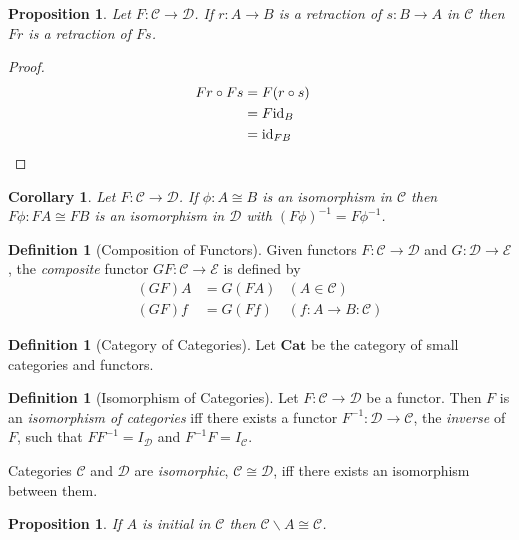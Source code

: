 \documentclass{book}
\let\qed\relax
\newtheorem{prop}[ax]{Proposition}
\newtheorem{cor}{Corollary}[ax]
\theoremstyle{definition}
\newtheorem{df}[ax]{Definition}
\newcommand{\id}[1]{\ensuremath{\mathrm{id}_{#1}}}
\newcommand{\inv}[1]{\ensuremath{{#1}^{-1}}}
\begin{document}
\begin{prop}
Let $F : \mathcal{C} \rightarrow \mathcal{D}$. If $r : A \rightarrow B$ is a retraction of $s : B \rightarrow A$ in $\mathcal{C}$ then $Fr$ is a retraction of $Fs$.
\end{prop}

\begin{proof}
\pf
\begin{align*}
Fr \circ Fs & = F(r \circ s) \\
& = F \id{B} \\
& = \id{FB} & \qed
\end{align*}
\end{proof}

\begin{cor}
Let $F : \mathcal{C} \rightarrow \mathcal{D}$. If $\phi : A \cong B$ is an isomorphism in $\mathcal{C}$ then $F \phi : FA \cong FB$ is an isomorphism in $\mathcal{D}$ with $\inv{(F \phi)} = F \inv{\phi}$.
\end{cor}

\begin{df}[Composition of Functors]
Given functors $F : \mathcal{C} \rightarrow \mathcal{D}$ and $G : \mathcal{D} \rightarrow \mathcal{E}$, the \emph{composite} functor $GF : \mathcal{C} \rightarrow \mathcal{E}$ is defined by
\begin{align*}
(GF)A & = G(FA) & (A \in \mathcal{C}) \\
(GF)f & = G(Ff) & (f : A \rightarrow B : \mathcal{C})
\end{align*}
\end{df}

\begin{df}[Category of Categories]
Let $\mathbf{Cat}$ be the category of small categories and functors.
\end{df}

\begin{df}[Isomorphism of Categories]
Let $F : \mathcal{C} \rightarrow \mathcal{D}$ be a functor. Then $F$ is an \emph{isomorphism of categories} iff there exists a functor $\inv{F} : \mathcal{D} \rightarrow \mathcal{C}$, the \emph{inverse} of $F$, such that $F \inv{F} = I_{\mathcal{D}}$ and $\inv{F} F = I_{\mathcal{C}}$.

Categories $\mathcal{C}$ and $\mathcal{D}$ are \emph{isomorphic}, $\mathcal{C} \cong \mathcal{D}$, iff there exists an isomorphism between them.
\end{df}

\begin{prop}
If $A$ is initial in $\mathcal{C}$ then $\mathcal{C} \backslash A \cong \mathcal{C}$.
\end{prop}
\end{document}
